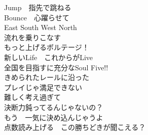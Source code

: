 {Jump　指先で跳ねる\\
Bounce　心躍らせて\\
East South West North\\
流れを乗りこなす\\
もっと上げるボルテージ！\\

新しいLife　これからがLive\\
全国を目指すに充分なSoul Five!!\\
きめられたレールに沿った\\
プレイじゃ満足できない\\
難しく考え過ぎて\\
決断力鈍ってるんじゃないの？\\
もう　一気に決め込んじゃうよ\\
点数読み上げる　この勝ちどきが聞こえる？
}


